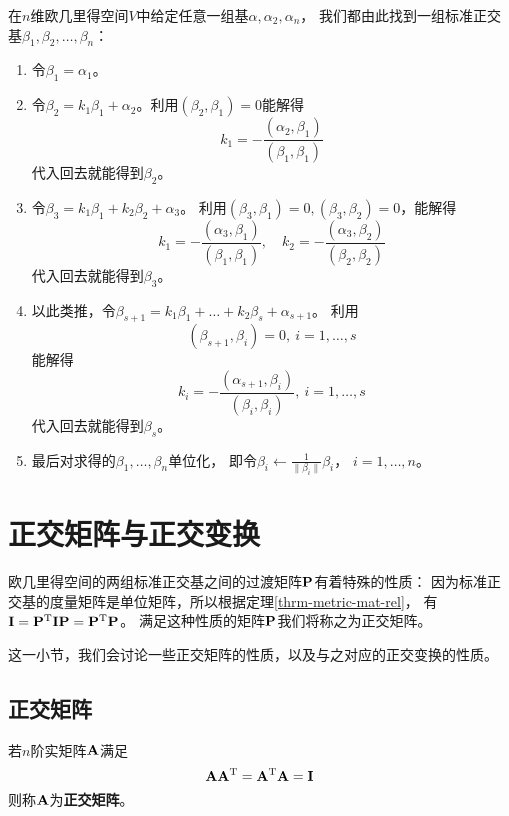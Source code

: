 \begin{theorem}
  在$n$维欧几里得空间$V$中给定任意一组基$\alpha,\alpha_2,\alpha_n$，
  我们都由此找到一组标准正交基$\beta_1,\beta_2,\dots,\beta_n$：
  \begin{enumerate}
    \item 
    令$\beta_1=\alpha_1$。
    \item
    令$\beta_2=k_1\beta_1+\alpha_2$。利用$(\beta_2,\beta_1)=0$能解得
    \begin{displaymath}
      k_1 = -\frac{(\alpha_2,\beta_1)}{(\beta_1,\beta_1)}
    \end{displaymath}
    代入回去就能得到$\beta_2$。
    \item
    令$\beta_3=k_1\beta_1+k_2\beta_2+\alpha_3$。
    利用$(\beta_3,\beta_1)=0,(\beta_3,\beta_2)=0$，能解得
    \begin{displaymath}
      k_1 = -\frac{(\alpha_3,\beta_1)}{(\beta_1,\beta_1)},\quad
      k_2 = -\frac{(\alpha_3,\beta_2)}{(\beta_2,\beta_2)}
    \end{displaymath}
    代入回去就能得到$\beta_3$。
    \item
    以此类推，令$\beta_{s+1}=k_1\beta_1+\dots+k_2\beta_s+\alpha_{s+1}$。
    利用\[ (\beta_{s+1},\beta_{i})=0,\ i=1,\dots,s \]
    能解得
    \begin{displaymath}
      k_i = -\frac{(\alpha_{s+1},\beta_{i})}{(\beta_{i},\beta_{i})},
      \ i=1,\dots,s
    \end{displaymath}
    代入回去就能得到$\beta_s$。
    \item
    最后对求得的$\beta_1,\dots,\beta_n$单位化，
    即令$\beta_i\leftarrow\frac{1}{\|\beta_i\|}\beta_i$，
    $i=1,\dots,n$。
  \end{enumerate}
\end{theorem}

\section{正交矩阵与正交变换}
欧几里得空间的两组标准正交基之间的过渡矩阵$\mathbf{P}$有着特殊的性质：
因为标准正交基的度量矩阵是单位矩阵，所以根据定理\ref{thrm-metric-mat-rel}，
有$\mathbf{I}=\mathbf{P}^{\textrm{T}}\mathbf{I}\mathbf{P}=\mathbf{P}^{\textrm{T}}\mathbf{P}$。
满足这种性质的矩阵$\mathbf{P}$我们将称之为正交矩阵。

这一小节，我们会讨论一些正交矩阵的性质，以及与之对应的正交变换的性质。

\subsection{正交矩阵}
\begin{definition}[正交矩阵]
  若$n$阶实矩阵$\mathbf{A}$满足
  \[ \mathbf{A}\mathbf{A}^{\textrm{T}} = \mathbf{A}^{\textrm{T}}\mathbf{A} = \mathbf{I} \]
  则称$\mathbf{A}$为\textbf{正交矩阵}。
\end{definition}

